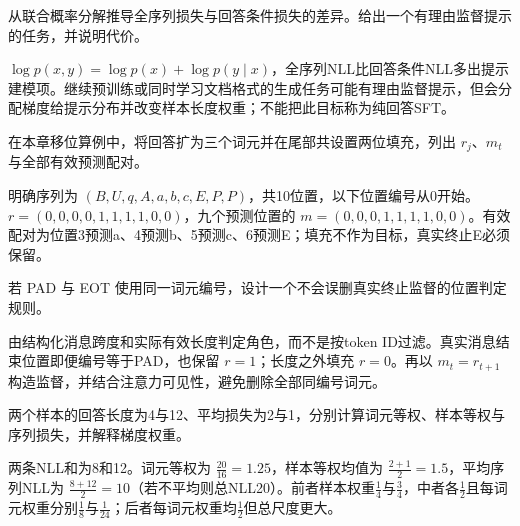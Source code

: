 
\begin{exercises}
\begin{exercise} 从联合概率分解推导全序列损失与回答条件损失的差异。给出一个有理由监督提示的任务，并说明代价。

\begin{solution}
$\log p(x,y)=\log p(x)+\log p(y\mid x)$，全序列NLL比回答条件NLL多出提示建模项。继续预训练或同时学习文档格式的生成任务可能有理由监督提示，但会分配梯度给提示分布并改变样本长度权重；不能把此目标称为纯回答SFT。
\end{solution}
\end{exercise}

\begin{exercise} 在本章移位算例中，将回答扩为三个词元并在尾部共设置两位填充，列出 $r_j$、$m_t$ 与全部有效预测配对。

\begin{solution}
明确序列为 $(B,U,q,A,a,b,c,E,P,P)$，共10位置，以下位置编号从0开始。$r=(0,0,0,0,1,1,1,1,0,0)$，九个预测位置的 $m=(0,0,0,1,1,1,1,0,0)$。有效配对为位置3预测a、4预测b、5预测c、6预测E；填充不作为目标，真实终止E必须保留。
\end{solution}
\end{exercise}

\begin{exercise} 若 PAD 与 EOT 使用同一词元编号，设计一个不会误删真实终止监督的位置判定规则。

\begin{solution}
由结构化消息跨度和实际有效长度判定角色，而不是按token ID过滤。真实消息结束位置即便编号等于PAD，也保留 $r=1$；长度之外填充 $r=0$。再以 $m_t=r_{t+1}$ 构造监督，并结合注意力可见性，避免删除全部同编号词元。
\end{solution}
\end{exercise}

\begin{exercise} 两个样本的回答长度为4与12、平均损失为2与1，分别计算词元等权、样本等权与序列损失，并解释梯度权重。

\begin{solution}
两条NLL和为8和12。词元等权为 $\frac{20}{16}=1.25$，样本等权均值为 $\frac{2+1}{2}=1.5$，平均序列NLL为 $\frac{8+12}{2}=10$（若不平均则总NLL20）。前者样本权重$\frac{1}{4}$与$\frac{3}{4}$，中者各$\frac{1}{2}$且每词元权重分别$\frac{1}{8}$与$\frac{1}{24}$；后者每词元权重均$\frac{1}{2}$但总尺度更大。
\end{solution}
\end{exercise}


\end{exercises}
